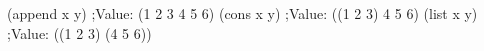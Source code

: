\begtt\scm
(append x y)
;Value: (1 2 3 4 5 6)
(cons x y)
;Value: ((1 2 3) 4 5 6)
(list x y)
;Value: ((1 2 3) (4 5 6))
\endtt
